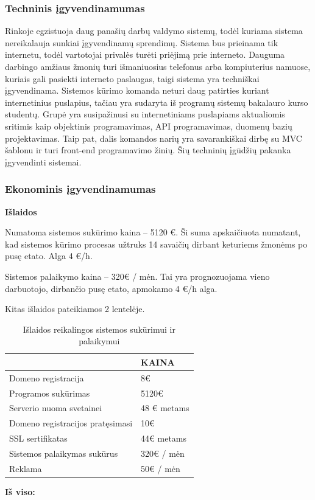 \documentclass{VUMIFPSkursinis}
\begin{document}
\subsubsection{Techninis įgyvendinamumas}
Rinkoje egzistuoja daug panašių darbų valdymo sistemų, todėl kuriama sistema nereikalauja sunkiai įgyvendinamų sprendimų. Sistema bus prieinama tik internetu, todėl vartotojai privalės turėti priėjimą prie interneto. Dauguma darbingo amžiaus žmonių turi išmaniuosius telefonus arba kompiuterius namuose, kuriais gali pasiekti interneto paslaugas, taigi sistema yra techniškai įgyvendinama. Sistemos kūrimo komanda neturi daug patirties kuriant internetinius puslapius, tačiau yra sudaryta iš programų sistemų bakalauro kurso studentų. Grupė yra susipažinusi su internetiniams puslapiams aktualiomis sritimis kaip objektinis programavimas, API programavimas, duomenų bazių projektavimas. Taip pat, dalis komandos narių yra savarankiškai dirbę su MVC šablonu ir turi front-end programavimo žinių. Šių techninių įgūdžių pakanka įgyvendinti sistemai.

\subsubsection{Ekonominis įgyvendinamumas}
\textbf{Išlaidos}

Numatoma sistemos sukūrimo kaina – 5120 €. Ši suma apskaičiuota numatant, kad sistemos kūrimo procesas užtruks 14 savaičių dirbant keturiems žmonėms po pusę etato. Alga 4 €/h.

Sistemos palaikymo kaina – 320€ / mėn. Tai yra prognozuojama vieno darbuotojo, dirbančio pusę etato, apmokamo 4 €/h alga.

Kitas išlaidos pateikiamos 2 lentelėje.
\begin{table}[H]
\caption{Išlaidos reikalingos sistemos sukūrimui ir palaikymui}
\centering
\normalsize
\begin{tabular}{|p{8cm}|p{4cm}|}
\hline
\rowcolor{gray!40}
\multicolumn{1}{|m{8cm}|}{\textbf{IŠLAIDOS}}&\multicolumn{1}{m{4cm}|}{\textbf{KAINA}}\\ \hline
\multicolumn{1}{|m{8cm}|}{Domeno registracija}&\multicolumn{1}{m{4cm}|}{8€}\\ \hline
\multicolumn{1}{|m{8cm}|}{Programos sukūrimas}&\multicolumn{1}{m{4cm}|}{5120€}\\ \hline
\multicolumn{1}{|m{8cm}|}{Serverio nuoma svetainei}&\multicolumn{1}{m{4cm}|}{48 € metams}\\ \hline
\multicolumn{1}{|m{8cm}|}{Domeno registracijos pratęsimasi}&\multicolumn{1}{m{4cm}|}{10€}\\ \hline
\multicolumn{1}{|m{8cm}|}{SSL sertifikatas}&\multicolumn{1}{m{4cm}|}{44€ metams}\\ \hline
\multicolumn{1}{|m{8cm}|}{Sistemos palaikymas sukūrus}&\multicolumn{1}{m{4cm}|}{320€ / mėn}\\ \hline
\multicolumn{1}{|m{8cm}|}{Reklama}&\multicolumn{1}{m{4cm}|}{50€ / mėn}\\ \hline
\end{tabular}
\end{table}
\textbf{Iš viso:}
\end{document}
